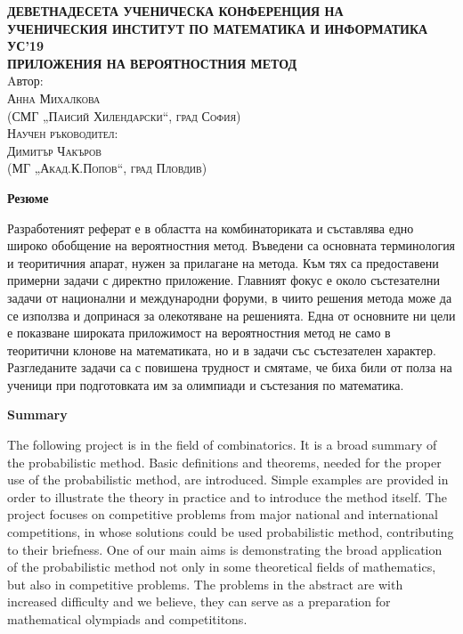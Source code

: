 \documentclass[11 pt, a4paper]{article}
\theoremstyle{definition}
\theoremstyle{remark}
\begin{document}
\begin{center}
\vspace{- 1.5cm}
\large\textbf {ДЕВЕТНАДЕСЕТА УЧЕНИЧЕСКА КОНФЕРЕНЦИЯ НА \\ УЧЕНИЧЕСКИЯ ИНСТИТУТ ПО МАТЕМАТИКА И ИНФОРМАТИКА\\УС'19}\\
\vspace{3cm}
\huge\textbf {ПРИЛОЖЕНИЯ НА ВЕРОЯТНОСТНИЯ МЕТОД}\\
\vspace{3cm}
\large{Aвтор:}\\
\Large\scshape Анна Михалкова\\
(СМГ „Паисий Хилендарски“, град София)\\
\vspace{3cm}
\large{Научен ръководител:\\}
\large{\textsc{Димитър Чакъров}\\
(МГ „Акад.К.Попов“, град Пловдив)}
\end{center}
\newpage
\begin{normalsize}
\begin{center}
\textbf{Резюме}
\end{center}
Разработеният реферат е в областта на комбинаториката и съставлява едно широко обобщение на вероятностния метод. Въведени са основната терминология и теоритичния апарат, нужен за прилагане на метода. Към тях са предоставени примерни задачи с директно приложение. Главният фокус е около състезателни задачи от национални и международни
 форуми, в чиито решения метода може да се използва и допринася за олекотяване на решенията. Една от основните ни цели е показване широката приложимост на вероятностния метод не само в теоритични клонове на математиката, но и в задачи със състезателен характер. Разгледаните задачи са с повишена трудност и смятаме, че биха били от полза на ученици при подготовката им за олимпиади и състезания по математика.
\end{normalsize}
\begin{normalsize}
\begin{center}
\textbf{Summary}
\end{center}
The following project is in the field of combinatorics. It is a broad summary of the probabilistic method. Basic definitions and theorems, needed for the proper use of the probabilistic method, are introduced. Simple examples are provided in order to illustrate the theory in practice and to introduce the method itself. The project focuses on competitive problems from major national and  international competitions, in whose solutions could be used probabilistic method, contributing to their briefness. One of our main aims is demonstrating the broad application of the probabilistic method not only in some theoretical fields of mathematics, but also in competitive problems. The problems in the abstract are with increased difficulty and we believe, they can serve as a preparation for mathematical olympiads and competititons.

\end{normalsize}
\newpage
\end{document}
